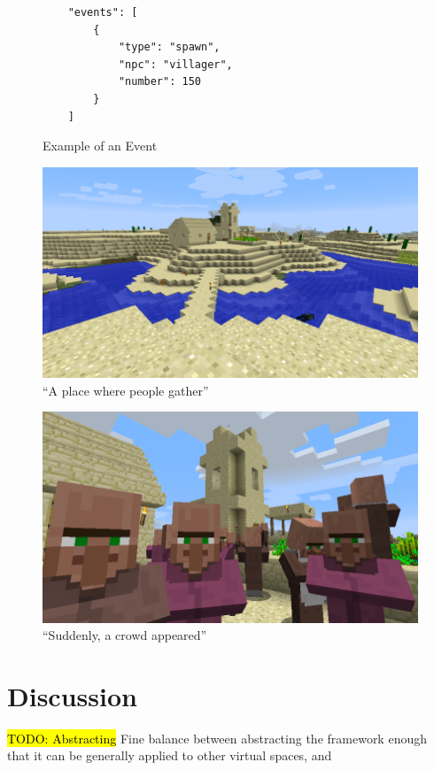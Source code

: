 \documentclass{acm}
\newcommand{\TODO}[1]{\hl{TODO: #1}}
\begin{document}
\begin{figure}
\centering
\begin{verbatim}
    "events": [
        {
            "type": "spawn",
            "npc": "villager",
            "number": 150
        }
    ]
\end{verbatim}

\caption{Example of an Event}
\label{figure:event}
\end{figure}


\begin{figure}
\centering
\includegraphics[scale=.24]{./figures/place.png}
\caption{``A place where people gather''}
\label{figure:gather}
\end{figure}

\begin{figure}
\centering
\includegraphics[scale=0.24]{./figures/villagers.png}
\caption{``Suddenly, a crowd appeared''}
\label{figure:villagers}
\end{figure}


\section{Discussion}
\TODO{Abstracting}
Fine balance between abstracting the framework enough that it can be generally applied to other virtual spaces, and 
\end{document}
